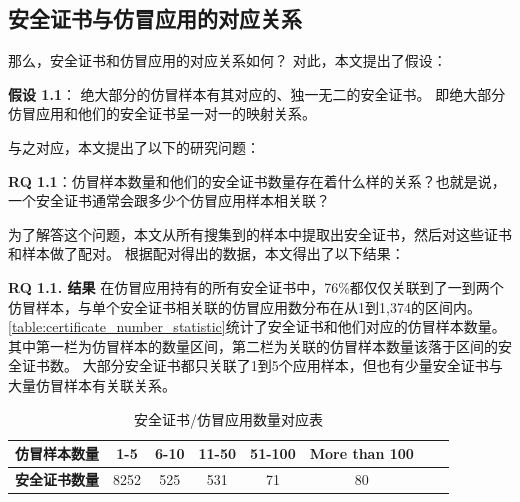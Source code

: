 \subsection{安全证书与仿冒应用的对应关系}
那么，安全证书和仿冒应用的对应关系如何？
对此，本文提出了假设：

{\bf 假设 1.1}： 绝大部分的仿冒样本有其对应的、独一无二的安全证书。
即绝大部分仿冒应用和他们的安全证书呈一对一的映射关系。

与之对应，本文提出了以下的研究问题：

{\bf RQ 1.1}：仿冒样本数量和他们的安全证书数量存在着什么样的关系？也就是说，一个安全证书通常会跟多少个仿冒应用样本相关联？

为了解答这个问题，本文从所有搜集到的样本中提取出安全证书，然后对这些证书和样本做了配对。
根据配对得出的数据，本文得出了以下结果：

{\bf RQ 1.1. 结果}
在仿冒应用持有的所有安全证书中，76\%都仅仅关联到了一到两个仿冒样本，与单个安全证书相关联的仿冒应用数分布在从1到1,374的区间内。
\autoref{table:certificate_number_statistic}统计了安全证书和他们对应的仿冒样本数量。
其中第一栏为仿冒样本的数量区间，第二栏为关联的仿冒样本数量该落于区间的安全证书数。
大部分安全证书都只关联了1到5个应用样本，但也有少量安全证书与大量仿冒样本有关联关系。

\begin{table}[htbp]
  \renewcommand{\arraystretch}{1}
  \footnotesize
  \centering
  \caption{安全证书/仿冒应用数量对应表}
  \vspace{1mm}
  \begin{tabular}{l c c c c c c c}
  \toprule
  {\bf 仿冒样本数量} & {\bf 1-5} & {\bf 6-10} & {\bf 11-50} & {\bf 51-100} & {\bf More than 100} \\
  \midrule
  {\bf 安全证书数量} & 8252 & 525 & 531 & 71 & 80 \\
  \bottomrule
  \end{tabular}
  \label{table:certificate_number_statistic}
\end{table}

